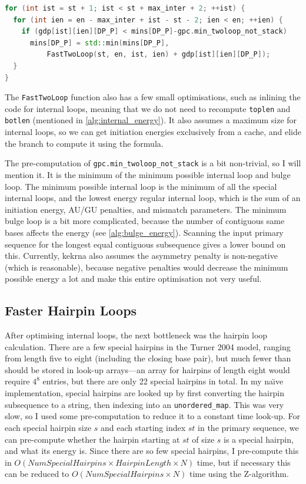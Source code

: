 \documentclass{cshonours}
\begin{document}
\begin{lstlisting}[caption={Faster internal loops},label={lst:faster_internal_loops},language=C++]
for (int ist = st + 1; ist < st + max_inter + 2; ++ist) {
  for (int ien = en - max_inter + ist - st - 2; ien < en; ++ien) {
    if (gdp[ist][ien][DP_P] < mins[DP_P]-gpc.min_twoloop_not_stack)
      mins[DP_P] = std::min(mins[DP_P], 
          FastTwoLoop(st, en, ist, ien) + gdp[ist][ien][DP_P]);
  }
}
\end{lstlisting}

The \texttt{FastTwoLoop} function also has a few small optimisations, such as inlining the code for internal loops, meaning that we do not need to recompute \texttt{toplen} and \texttt{botlen} (mentioned in \autoref{alg:internal_energy}). It also assumes a maximum size for internal loops, so we can get initiation energies exclusively from a cache, and elide the branch to compute it using the formula.

The pre-computation of \texttt{gpc.min\_twoloop\_not\_stack} is a bit non-trivial, so I will mention it. It is the minimum of the minimum possible internal loop and bulge loop. The minimum possible internal loop is the minimum of all the special internal loops, and the lowest energy regular internal loop, which is the sum of an initiation energy, AU/GU penalties, and mismatch parameters. The minimum bulge loop is a bit more complicated, because the number of contiguous same bases affects the energy (see \autoref{alg:bulge_energy}). Scanning the input primary sequence for the longest equal contiguous subsequence gives a lower bound on this. Currently, kekrna also assumes the asymmetry penalty is non-negative (which is reasonable), because negative penalties would decrease the minimum possible energy a lot and make this entire optimisation not very useful.

\subsection{Faster Hairpin Loops}
After optimising internal loops, the next bottleneck was the hairpin loop calculation. There are a few special hairpins in the Turner 2004 model, ranging from length five to eight (including the closing base pair), but much fewer than should be stored in look-up arrays---an array for hairpins of length eight would require $4^8$ entries, but there are only 22 special hairpins in total. In my na\"{\i}ve implementation, special hairpins are looked up by first converting the hairpin subsequence to a string, then indexing into an \texttt{unordered\_map}. This was very slow, so I used some pre-computation to reduce it to a constant time look-up. For each special hairpin size $s$ and each starting index $st$ in the primary sequence, we can pre-compute whether the hairpin starting at $st$ of size $s$ is a special hairpin, and what its energy is. Since there are so few special hairpins, I pre-compute this in $O(NumSpecialHairpins \times HairpinLength \times N)$ time, but if necessary this can be reduced to $O(NumSpecialHairpins \times N)$ time using the Z-algorithm.
\end{document}
